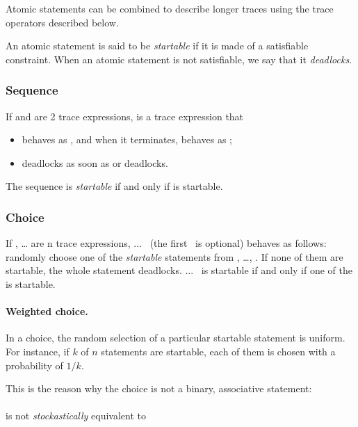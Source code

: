 Atomic statements can be combined to describe longer traces using the
trace operators described below.

An atomic statement is said to be  {\em startable} if it is made of a
satisfiable constraint.  When an atomic statement is not satisfiable,
we say that it {\em deadlocks}.




\subsubsection{Sequence}

If  and  are 2 trace expressions,
   
is a trace expression that 
\begin{itemize}
\item  behaves  as ,  and  when  it  terminates, behaves  as
  ;
\item deadlocks as soon as  or  deadlocks.
\end{itemize}

The sequence     is {\em startable} if and
only if  is startable.


\subsubsection{Choice}

If  , \dots  {}  are n  trace  expressions, \OB  \BAR
{} \BAR ... \BAR {}  \CB\ (the first \BAR\ is optional)
behaves  as  follows: randomly  choose  one  of  the {\em  startable}
statements  from , \dots,  .  If  none of  them are
startable, the  whole statement  deadlocks.  \OB \BAR  {} \BAR
...   \BAR {}  \CB\ is  startable if  and only  if one  of the
 is startable.




\paragraph{Weighted choice.}
 
In a choice, the random selection of a particular startable statement
is uniform.  For instance,  if $k$ of  $n$ statements  are startable,
each of them is chosen with a probability of $1/k$.

This  is the  reason  why the  choice  is not  a binary,  associative
statement:\\  \OB {}  \BAR  \OB {}  \BAR {}  \CB
\CB\\ is  not {\em stockastically} equivalent to\\  \OB \OB {}
\BAR {} \CB \BAR {} \CB

